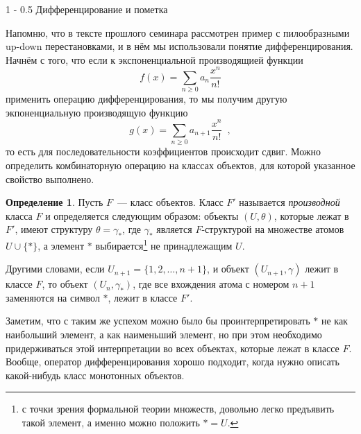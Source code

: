 \documentclass[a5paper]{article}
\makeatletter
\theoremstyle{definition}
\newtheorem*{definition}{Определение}
\renewcommand{\subsection}{\@startsection
{subsection}%
{1}%
{\z@}%
{-\baselineskip}%
{0.5\baselineskip}%
{\centering\large\scshape}} %
\makeatother
\begin{document}
\subsection{Дифференцирование и пометка}
 
Напомню, что в тексте прошлого семинара рассмотрен пример с пилообразными
up-down перестановками, и в нём мы использовали понятие дифференцирования.
Начнём с того, что если к экспоненциальной производящией функции
\[
    f(x) = \sum_{n \geq 0} a_n \dfrac{x^n}{n!}
\]
применить операцию дифференцирования, то мы получим другую экпоненциальную
производящую функцию
\[
    g(x) = \sum_{n \geq 0} a_{n+1} \dfrac{x^n}{n!} \enspace ,
\]
то есть для последовательности коэффициентов происходит сдвиг. Можно определить
комбинаторную операцию на классах объектов, для которой указанное свойство
выполнено.

\begin{definition}
    Пусть \( F \)~--- класс объектов. Класс \( F' \) называется
\textit{производной} класса \( F \) и определяется следующим образом: объекты
\( (U, \theta) \), которые лежат в \( F' \), имеют структуру
\(
    \theta = \gamma_{\ast}
\),
где \( \gamma_{\ast} \) является \( F \)-структурой на множестве атомов \( U
\cup \{\ast\} \), а элемент \( \ast \) выбирается\footnote{с точки зрения
формальной теории множеств, довольно легко предъявить такой элемент, а именно
можно положить \( \ast = U \).} не принадлежащим \( U \).

Другими словами, если
\( U_{n+1} = \{ 1, 2, \ldots, n+1 \} \), и объект \( (U_{n+1}, \gamma) \) лежит
в классе \( F \), то объект \( (U_n, \gamma_{\ast}) \), где все вхождения атома с
номером \( n+1 \) заменяются на символ \( \ast \), лежит в классе \( F' \).
\end{definition}

Заметим, что с таким же успехом можно было бы проинтерпретировать \( \ast \) не
как наибольший элемент, а как наименьший элемент, но при этом необходимо
придерживаться этой интерпретации во всех объектах, которые лежат в классе \( F
\). Вообще, оператор дифференцирования хорошо подходит, когда нужно описать
какой-нибудь класс монотонных объектов.
\end{document}
